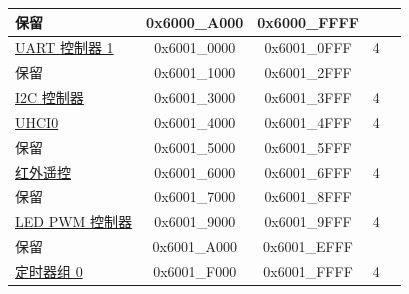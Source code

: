 \begin{longtable}[c]{ |p{5cm}|c|c|r|p{1.0cm}| }
    \rowcolor{gray!25}  保留                    & 0x6000\_A000 & 0x6000\_FFFF &        &   \\\hline
                
                        \hyperref[mod:uart]{UART 控制器 1}           & 0x6001\_0000 & 0x6001\_0FFF &   4    &   \\\hline
    \rowcolor{gray!25}  保留                    & 0x6001\_1000 & 0x6001\_2FFF &        &   \\\hline
                        \hyperref[mod:i2c]{I2C 控制器}              & 0x6001\_3000 & 0x6001\_3FFF &   4    &   \\\hline
                        \hyperref[mod:uart]{UHCI0}                   & 0x6001\_4000 & 0x6001\_4FFF &   4    &   \\\hline
    \rowcolor{gray!25}  保留                    & 0x6001\_5000 & 0x6001\_5FFF &        &   \\\hline
                        \hyperref[mod:rmt]{红外遥控}                & 0x6001\_6000 & 0x6001\_6FFF &   4    &   \\\hline
    \rowcolor{gray!25}  保留                    & 0x6001\_7000 & 0x6001\_8FFF &        &   \\\hline
                        \hyperref[mod:ledpwm]{LED PWM 控制器}          & 0x6001\_9000 & 0x6001\_9FFF &   4    &   \\\hline
    \rowcolor{gray!25}  保留                    & 0x6001\_A000 & 0x6001\_EFFF &        &   \\\hline
                        \hyperref[mod:timg]{定时器组 0}              & 0x6001\_F000 & 0x6001\_FFFF &   4    &   \\\hline
                        

\end{longtable}

